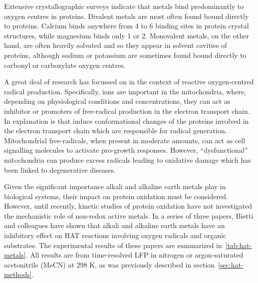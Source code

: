 Extensive crystallographic surveys indicate that metals bind predominantly to oxygen centres in proteins.\cite{Harding1999, Harding2001, Hsin2006} Divalent metals are most often found bound directly to proteins. Calcium binds anywhere from 4 to 6 binding sites in protein crystal structures, while magnesium binds only 1 or 2. Monovalent metals, on the other hand, are often heavily solvated and so they appear in solvent cavities of proteins, although sodium or potassium are sometimes found bound directly to carbonyl or carboxylate oxygen centres.\cite{Harding2010}

A great deal of research has focussed on  in the context of reactive oxygen-centred radical production.\cite{Goerlach2015} Specifically,  ions are important in the mitochondria, where, depending on physiological conditions and concentrations, they can act as inhibitor or promoters of free-radical production in the electron transport chain.\cite{AdamVizi2010} In explanation is that  induce conformational changes of the proteins involved in the electron transport chain which are responsible for radical generation.\cite{Brookes2004} Mitochondrial free-radicals, when present in moderate amounts, can act as cell signalling molecules to activate pro-growth responses.\cite{Sullivan2014} However, ``dysfunctional'' mitochondria can produce excess radicals leading to oxidative damage which has been linked to degenerative diseases.

Given the significant importance alkali and alkaline earth metals play in biological systems, their impact on protein oxidation must be considered. However, until recently, kinetic studies of protein oxidation have not investigated the mechanistic role of non-redox active metals. In a series of three papers,\cite{Salamone2013a, Salamone2015metals, Salamone2016} Bietti and colleagues have shown that alkali and alkaline earth metals have an inhibitory effect on HAT reactions involving oxygen radicals and organic substrates. The experimental results of these papers are summarized in~\ref{tab:hat-metals}. All results are from time-resolved LFP in nitrogen or argon-saturated acetonitrile (MeCN) at 298 K, as was previously described in section~\ref{sec:hat-methods}.

